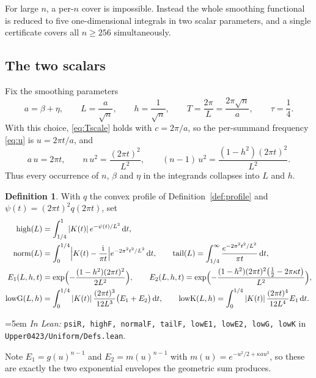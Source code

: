 \documentclass[11pt,a4paper]{article}
\theoremstyle{definition}
\newtheorem{definition}[theorem]{Definition}
\newcommand{\ii}{\mathrm{i}}
\newcommand{\dd}{\,\mathrm{d}}
\newcommand{\kap}{\kappa}
\newcommand{\Lean}[1]{\texttt{#1}}
\newcommand{\file}[1]{\texttt{#1}}
\newcommand{\formal}[2]{%
  \par\smallskip
  \begingroup\small\raggedright\emergencystretch=5em
  \noindent\textit{In Lean:} \Lean{#1} in \file{#2}.\par
  \endgroup\smallskip}
\begin{document}
For large $n$, a per-$n$ cover is impossible. Instead the whole smoothing
functional is reduced to five one-dimensional integrals in two scalar parameters,
and a single certificate covers all $n\ge256$ simultaneously.

\subsection{The two scalars}

Fix the smoothing parameters
\begin{equation}
  \label{eq:uniform-params}
  a=\beta+\eta,\qquad
  L=\frac{a}{\sqrt n},\qquad
  h=\frac1{\sqrt n},\qquad
  T=\frac{2\pi}{L}=\frac{2\pi\sqrt n}{a},\qquad
  \tau=\frac14 .
\end{equation}
With this choice, \eqref{eq:Tscale} holds with $c=2\pi/a$, so the per-summand
frequency \eqref{eq:u} is $u=2\pi t/a$, and
\[
  a\,u=2\pi t,\qquad n\,u^2=\frac{(2\pi t)^2}{L^2},\qquad
  (n-1)\,u^2=\frac{(1-h^2)(2\pi t)^2}{L^2} .
\]
Thus every occurrence of $n$, $\beta$ and $\eta$ in the integrands collapses into
$L$ and $h$.

\begin{definition}
  \label{def:uniform}
  With $q$ the convex profile of Definition~\ref{def:profile} and
  $\psi(t)=(2\pi t)^2q(2\pi t)$, set
  \begin{align*}
    \mathrm{high}(L)&=\int_{1/4}^{1}|K(t)|\,e^{-\psi(t)/L^2}\dd t,\\
    \mathrm{norm}(L)&=\int_0^{1/4}\Bigl|K(t)-\frac{\ii}{\pi t}\Bigr|
      e^{-2\pi^2t^2/L^2}\dd t,\qquad
    \mathrm{tail}(L)=\int_{1/4}^\infty\frac{e^{-2\pi^2t^2/L^2}}{\pi t}\dd t,\\
    E_1(L,h,t)&=\exp\Bigl(-\frac{(1-h^2)(2\pi t)^2}{2L^2}\Bigr),\qquad
    E_2(L,h,t)=\exp\Bigl(-\frac{(1-h^2)(2\pi t)^2
      \bigl(\tfrac12-2\pi\kap t\bigr)}{L^2}\Bigr),\\
    \mathrm{lowG}(L,h)&=\int_0^{1/4}|K(t)|\,\frac{(2\pi t)^3}{12L^3}
      \bigl(E_1+E_2\bigr)\dd t,\qquad
    \mathrm{lowK}(L,h)=\int_0^{1/4}|K(t)|\,\frac{(2\pi t)^4}{12L^4}E_1\dd t .
  \end{align*}
\end{definition}
\formal{psiR, highF, normalF, tailF, lowE1, lowE2, lowG, lowK}{Upper0423/Uniform/Defs.lean}

Note $E_1=g(u)^{n-1}$ and $E_2=m(u)^{n-1}$ with $m(u)=e^{-u^2/2+\kap a u^3}$, so
these are exactly the two exponential envelopes the geometric sum produces.
\end{document}

